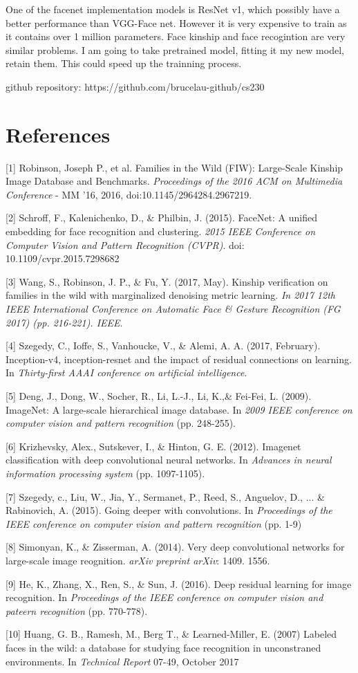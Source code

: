 \documentclass{article}
\begin{document}
One of the facenet implementation models is ResNet v1, which possibly have a
better performance than VGG-Face net. However it is very expensive to train as
it contains over 1 million parameters. Face kinship and face recogintion are
very similar problems. I am going to take pretrained model, fitting it my new
model, retain them. This could speed up the trainning process.

github repository: https://github.com/brucelau-github/cs230

\newpage
\section*{References}
\medskip
\small
[1] Robinson, Joseph P., et al. Families in the Wild (FIW): Large-Scale Kinship
Image Database and Benchmarks. {\it Proceedings of the 2016 ACM on Multimedia
Conference} - MM '16, 2016, doi:10.1145/2964284.2967219.

[2] Schroff, F., Kalenichenko, D., \& Philbin, J. (2015). FaceNet: A unified
embedding for face recognition and clustering. {\it 2015 IEEE Conference on
Computer Vision and Pattern Recognition (CVPR)}. doi: 10.1109/cvpr.2015.7298682

[3] Wang, S., Robinson, J. P., \& Fu, Y. (2017, May). Kinship verification on
families in the wild with marginalized denoising metric learning. {\it In 2017 12th
IEEE International Conference on Automatic Face \& Gesture Recognition (FG 2017)
(pp. 216-221). IEEE}.

[4] Szegedy, C., Ioffe, S., Vanhoucke, V., \& Alemi, A. A. (2017, February).
Inception-v4, inception-resnet and the impact of residual connections on
learning. In {\it Thirty-first AAAI conference on artificial intelligence}.

[5] Deng, J., Dong, W., Socher, R., Li, L.-J., Li, K.,\& Fei-Fei, L. (2009).
ImageNet: A large-scale hierarchical image database. In {\it 2009 IEEE
conference on computer vision and pattern recognition} (pp. 248-255).

[6] Krizhevsky, Alex., Sutskever, I., \& Hinton, G. E. (2012). Imagenet
classification with deep convolutional neural networks. In {\it Advances in
neural information processing system} (pp. 1097-1105).

[7] Szegedy, c., Liu, W., Jia, Y., Sermanet, P., Reed, S., Anguelov, D., ... \& Rabinovich, A. (2015). Going deeper with convolutions. In {\it Proceedings of the IEEE conference on computer vision and pattern recognition} (pp. 1-9)

[8] Simonyan, K., \& Zisserman, A. (2014). Very deep convolutional networks for large-scale image reognition. {\it arXiv preprint arXiv}: 1409. 1556.

[9] He, K., Zhang, X., Ren, S., \& Sun, J. (2016). Deep residual learning for image recognition. In {\it Proceedings of the IEEE conference on computer vision and pateern recognition} (pp. 770-778).

[10] Huang, G. B., Ramesh, M., Berg T., \& Learned-Miller, E. (2007) Labeled faces in the wild: a database for studying face recognition in unconstraned environments. In {\it Technical Report} 07-49, October 2017
\end{document}
